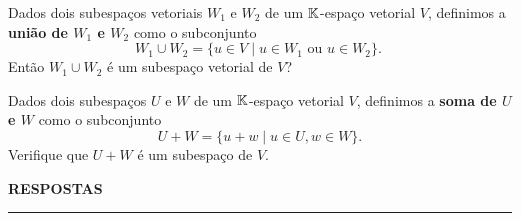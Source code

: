 \documentclass[12pt]{exam}
\begin{document}
\begin{exercicio}
    Dados dois subespaços vetoriais $W_1$ e $W_2$ de um $\mathbb{K}$-espaço vetorial $V$, definimos a \textbf{união de $W_1$ e $W_2$} como o subconjunto
    \[
        W_1 \cup W_2 = \{u \in V \mid u\in W_1 \mbox{ ou } u \in W_2\}.\
    \]
    Então $W_1 \cup W_2$ é um subespaço vetorial de $V$?
\end{exercicio}

\begin{exercicio}
    Dados dois subespaços $U$ e $W$ de um $\mathbb{K}$-espaço vetorial $V$, definimos a \textbf{soma de $U$ e $W$} como o subconjunto
    \[
        U + W = \{u + w \mid u \in U, w \in W\}.
    \]
    Verifique que $U + W$ é um subespaço de $V$.
\end{exercicio}

\newpage
{}

\begin{center}
{\large\bf RESPOSTAS}
\end{center}
\hrule

\end{document}
